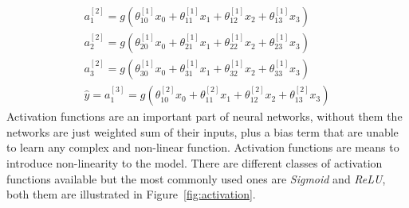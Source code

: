 \begin{equation}
\begin{split}
a_{ 1 }^{ [2] }=g(\theta _{ 10 }^{ [1] }x_{ 0 }+\theta _{ 11 }^{ [1]}x_{ 1 }+\theta _{ 12 }^{ [1] }x_{ 2 }+\theta _{ 13 }^{ [1] }x_{ 3 })\\ 
a_{ 2 }^{ [2] }=g(\theta _{ 20 }^{ [1] }x_{ 0 }+\theta _{ 21 }^{ [1] }x_{ 1 }+\theta _{ 22 }^{ [1] }x_{ 2 }+\theta _{ 23 }^{ [1] }x_{ 3 })\\
 a_{ 3 }^{ [2] }=g(\theta _{ 30 }^{ [1] }x_{ 0 }+\theta _{ 31 }^{ [1] }x_{ 1 }+\theta _{ 32 }^{ [1] }x_{ 2 }+\theta _{ 33 }^{ [1] }x_{ 3 })\\
  \hat { y } =a_{ 1 }^{ [3] }=g(\theta _{ 10 }^{ [2] }x_{ 0 }+\theta _{ 11 }^{ [2] }x_{ 1 }+\theta _{ 12 }^{ [2] }x_{ 2 }+\theta _{ 13 }^{ [2] }x_{ 3 })
\end{split}
\label{eq:nn_eq}
\end{equation}
Activation functions are an important part of neural networks, without them the networks are just weighted sum of their inputs, plus a bias term that are unable to learn any complex and non-linear function. Activation functions are means to introduce non-linearity to the model. There are different classes of activation functions available but the most commonly used ones are \emph{Sigmoid} and \emph{ReLU}, both them are illustrated in Figure~\ref{fig:activation}. 

